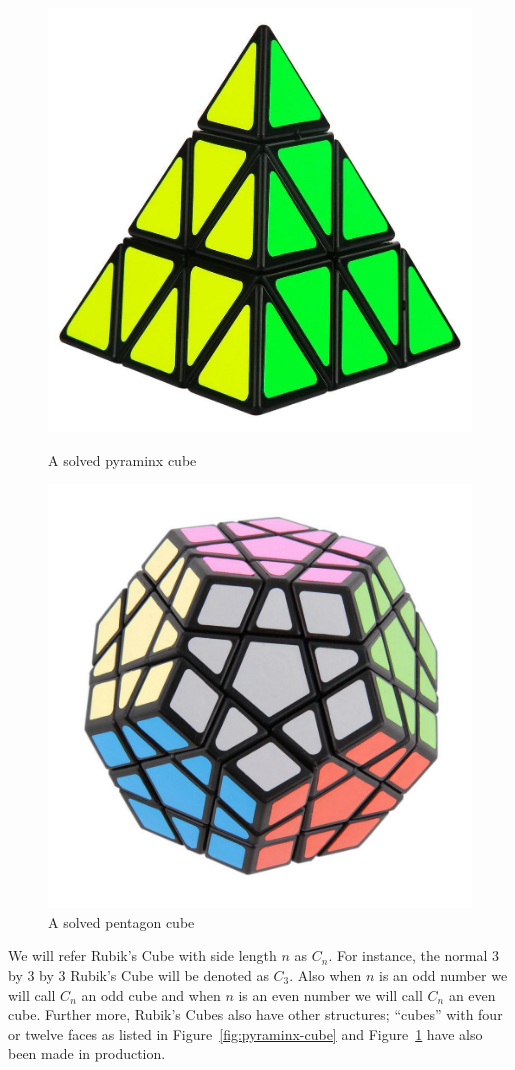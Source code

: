 \begin{figure}[ht]
    \centering
    \begin{minipage}{0.45\textwidth}
        \centering
        \includegraphics[width=.6\linewidth]{figures/introduction/pyraminx_cube.jpg}
        \caption{A solved pyraminx cube}\label{fig:pyraminx-cube}
    \end{minipage}
    \begin{minipage}{0.45\textwidth}
        \centering
        \includegraphics[width=.6\linewidth]{figures/introduction/pentagon_cube.jpg}
        \caption{A solved pentagon cube}\label{fig:pentagon-cube}
    \end{minipage}
\end{figure}
We will refer Rubik's Cube with side length $n$ as $C_n$. For instance, the normal 3 by 3 by 3 Rubik's Cube will be denoted as $C_3$. Also when $n$ is an odd number we will call $C_n$ an odd cube and when $n$ is an even number we will call $C_n$ an even cube. Further more, Rubik's Cubes also have other structures; ``cubes'' with four or twelve faces as listed in Figure~\ref{fig:pyraminx-cube} and Figure~\ref{fig:pentagon-cube} have also been made in production.
